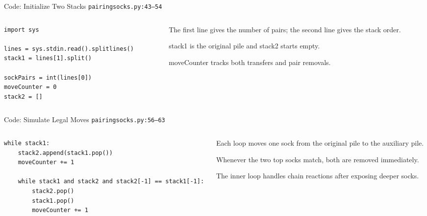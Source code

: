 \documentclass[aspectratio=169,11pt]{beamer}
\begin{document}
\begin{frame}[fragile]{Code: Initialize Two Stacks}
\scriptsize
{} \texttt{pairingsocks.py:43--54}

\vspace{0.08cm}
\begin{columns}[T,totalwidth=\textwidth]
\begin{column}{0.58\textwidth}
\begin{lstlisting}[style=cpcode]
import sys

lines = sys.stdin.read().splitlines()
stack1 = lines[1].split()

sockPairs = int(lines[0])
moveCounter = 0
stack2 = []
\end{lstlisting}
\end{column}
\begin{column}{0.38\textwidth}
\begin{tightitemize}
  \item The first line gives the number of pairs; the second line gives the stack order.
  \item stack1 is the original pile and stack2 starts empty.
  \item moveCounter tracks both transfers and pair removals.
\end{tightitemize}
\end{column}
\end{columns}
\end{frame}

\begin{frame}[fragile]{Code: Simulate Legal Moves}
\scriptsize
{} \texttt{pairingsocks.py:56--63}

\vspace{0.08cm}
\begin{columns}[T,totalwidth=\textwidth]
\begin{column}{0.58\textwidth}
\begin{lstlisting}[style=cpcode]
while stack1:
    stack2.append(stack1.pop())
    moveCounter += 1

    while stack1 and stack2 and stack2[-1] == stack1[-1]:
        stack2.pop()
        stack1.pop()
        moveCounter += 1
\end{lstlisting}
\end{column}
\begin{column}{0.38\textwidth}
\begin{tightitemize}
  \item Each loop moves one sock from the original pile to the auxiliary pile.
  \item Whenever the two top socks match, both are removed immediately.
  \item The inner loop handles chain reactions after exposing deeper socks.
\end{tightitemize}
\end{column}
\end{columns}
\end{frame}
\end{document}
